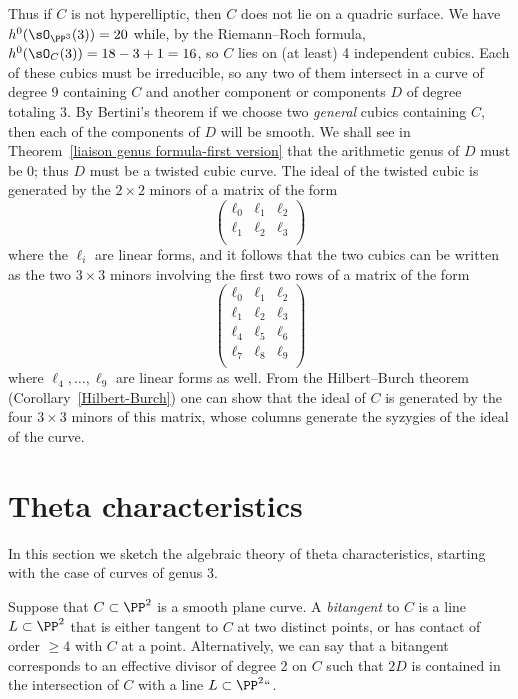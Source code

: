 Thus if $C$ is not hyperelliptic, then $C$ does not lie on a quadric
surface. We have $h^0(\sO_{\PP^3}(3)) = 20$ while, by the Riemann--Roch
formula, $h^0(\sO_C(3)) = 18-3+1= 16$, so $C$ lies on (at least) 4
independent cubics. Each of these cubics must be irreducible, so any
two of them
intersect in a curve of degree 9 containing $C$ and another component
or components $D$ of degree totaling 3. By
Bertini's theorem
%
if we choose two \emph{general} cubics containing $C$, then each of the
components of $D$ will be smooth. We shall see in
Theorem~\ref{liaison genus formula-first version}
that the arithmetic genus of $D$ must be 0;
thus $D$ must be a
twisted cubic
%
 curve. The ideal of the twisted cubic
is generated by the $2\times 2$ minors of a matrix of the form
$$
\begin{pmatrix}
 \ell_0& \ell_1&\ell_2\\
 \ell_1& \ell_2&\ell_3\\
\end{pmatrix}
$$
where the $\ell_i$ are linear forms,
and it follows that the two cubics can be written as the two $3\times 3$
minors involving the first two rows of  a matrix of the form
$$
\begin{pmatrix}
\label{hilbert-burch matrix}
 \ell_0& \ell_1&\ell_2\\
 \ell_1& \ell_2&\ell_3\\
\ell_4& \ell_5&\ell_6\\
 \ell_7& \ell_8&\ell_9\\
\end{pmatrix}
$$
where $\ell_4,\dots,\ell_9$ are linear forms as well.
From the
Hilbert--Burch theorem
%
(Corollary~\ref{Hilbert-Burch}) one can
show that the ideal of $C$ is generated by the four $3\times 3$ minors
of this matrix, whose columns generate
the
syzygies
%
of the ideal of the curve.

\section{Theta characteristics}

In this section we sketch the algebraic theory of theta characteristics,
%
starting with the case of curves of genus 3.

Suppose that $C \subset \PP^2$ is a smooth plane curve. A \emph{bitangent}
%
to $C$ is a line $L \subset \PP^2$ that is either tangent to $C$ at
two distinct points, or has contact of order $\geq 4$ with $C$ at a
point. Alternatively, we can say that a bitangent  corresponds to an
effective divisor of degree 2 on $C$ such that $2D$ is contained in the
intersection of $C$ with a line $L \subset \PP^2` `$.

